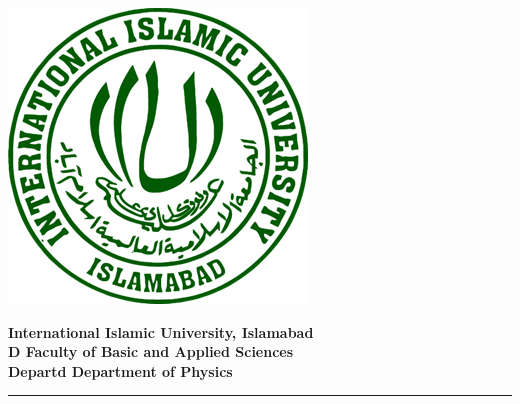 \documentclass[12pt]{article}
\begin{document}
\vspace*{0.001cm}
\onehalfspacing
{}
\noindent
\begin{center}
\begin{minipage}{0.2\textwidth}
  \includegraphics[width=0.75\linewidth]{logo3}
\end{minipage}%
\hspace{8pt} %
\begin{minipage}{0.7\textwidth}
  \fontsize{17}{20}\selectfont
  \textcolor{iiu}{{\textbf{International Islamic University, Islamabad \\  \textcolor{fill}{D} \textbf{Faculty of Basic and Applied Sciences}  \\ \textcolor{fill}{Departd} \textbf{Department of Physics}}}}
\end{minipage}
\end{center}
\begin{center}


\rule{0.9\linewidth}{1pt}
\end{center}
\end{document}

